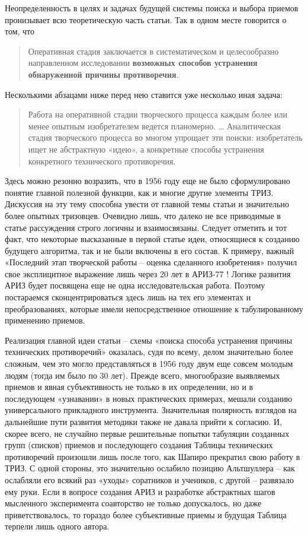 \documentclass[11pt,a4paper]{article}
\begin{document}
Неопределенность в целях и задачах будущей системы поиска и выбора приемов
пронизывает всю теоретическую часть статьи. Так в одном месте говорится о том,
что 
\begin{quote}
  Оперативная стадия заключается в систематическом и целесообразно
  направленном исследовании \textbf{возможных способов устранения обнаруженной
    причины противоречия}.
\end{quote}
Несколькими абзацами ниже перед нею ставится уже
несколько иная задача: 
\begin{quote}
  Работа на оперативной стадии творческого процесса каждым более или менее
  опытным изобретателем ведется планомерно. …  Аналитическая стадия
  творческого процесса во многом упрощает эти поиски: изобретатель ищет не
  абстрактную «идею», а конкретные способы устранения конкретного технического
  противоречия.
\end{quote}

Здесь можно резонно возразить, что в 1956 году еще не было сформулировано
понятие главной полезной функции, как и многие другие элементы ТРИЗ. Дискуссия
на эту тему способна увести от главной темы статьи и значительно более опытных
тризовцев. Очевидно лишь, что далеко не все приводимые в статье рассуждения
строго логичны и взаимосвязаны. Следует отметить и тот факт, что некоторые
высказанные в первой статье идеи, относящиеся к созданию будущего алгоритма,
так и не были включены в его состав. К примеру, важный «Последний этап
творческой работы -- оценка сделанного изобретения» получил свое эксплицитное
выражение лишь через 20 лет в АРИЗ-77 \cite{Altshuller1971}! Логике развития
АРИЗ будет посвящена еще не одна исследовательская работа. Поэтому постараемся
сконцентрироваться здесь лишь на тех его элементах и преобразованиях, которые
имели непосредственное отношение к табулированному применению приемов.

Реализация главной идеи статьи -- схемы «поиска способа устранения причины
технических противоречий» оказалась, судя по всему, делом значительно более
сложным, чем это могло представляться в 1956 году двум еще совсем молодым
людям (тогда им было по 30 лет). Прежде всего, многообразие выявляемых приемов
и явная субъективность не только в их определении, но и в последующем
«узнавании» в новых практических примерах, мешали созданию универсального
прикладного инструмента. Значительная полярность взглядов на дальнейшие пути
развития методики также не давала прийти к согласию. И, скорее всего, не
случайно первые решительные попытки табуляции созданных групп (списков)
приемов и последующего создания Таблицы технических противоречий произошли
лишь после того, как Шапиро прекратил свою работу в ТРИЗ. С одной стороны, это
значительно ослабило позицию Альтшуллера -- как ослабляли его всякий раз
«уходы» соратников и учеников, с другой -- развязало ему руки. Если в вопросе
создания АРИЗ и разработке абстрактных шагов мысленного эксперимента
соавторство не только допускалось, но даже приветствовалось, то гораздо более
субъективные приемы и будущая Таблица терпели лишь одного автора.
\end{document}
